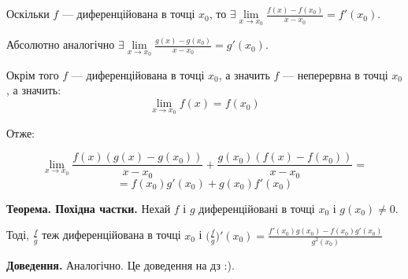 \documentclass[12pt]{report}
\begin{document}
Оскільки $f$ --- диференційована в точці $x_0$, то $\exists \lim\limits_{x \to x_0} \frac{f(x) - f(x_0)}{x - x_0} = f'(x_0)$.

Абсолютно аналогічно $\exists \lim\limits_{x \to x_0} \frac{g(x) - g(x_0)}{x - x_0} = g'(x_0)$.

Окрім того $f$ --- диференційована в точці $x_0$, а значить $f$ --- неперервна в точці $x_0$, а значить:
$$\lim_{x \to x_0} f(x) = f(x_0)$$

Отже:

$$\lim_{x \to x_0} \frac{f(x)(g(x) - g(x_0))}{x - x_0} + \frac{g(x_0)(f(x) - f(x_0))}{x - x_0} = $$
$$= f(x_0) g'(x_0) + g(x_0) f'(x_0)$$

\textbf{Теорема. Похідна частки.} Нехай $f$ і $g$ диференційовані в точці $x_0$ і $g(x_0) \neq 0$.

Тоді, $\frac{f}{g}$ теж диференційована в точці $x_0$ і $\Big(\frac{f}{g} \Big)'(x_0) = \frac{f'(x_0) g(x_0) - f(x_0)g'(x_0)}{g^2(x_0)}$

\textbf{Доведення.} Аналогічно. Це доведення на дз :).
\end{document}
